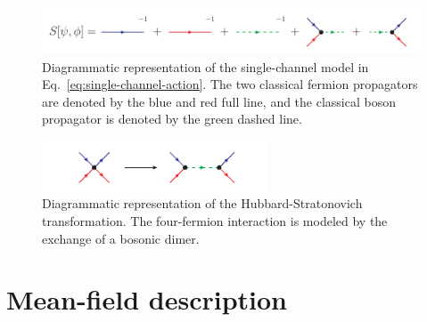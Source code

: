 \begin{figure}[t]
	\centering
	\includegraphics[width=\textwidth]{figs/action.pdf}
	\caption[Single-channel model]{Diagrammatic representation of the single-channel model in Eq.~\eqref{eq:single-channel-action}.
	The two classical fermion propagators are denoted by the blue and red full line, and the classical boson propagator is denoted by the green dashed line.}
	\label{fig:single-channel-model}
\end{figure}


\begin{figure}[b]
	\centering
	\includegraphics[width=0.6\textwidth]{figs/interaction.pdf}
	\caption[Microscopic interaction]{Diagrammatic representation of the Hubbard-Stratonovich transformation. The four-fermion interaction is modeled by the exchange of a bosonic dimer.}
	\label{fig:interaction}
\end{figure}


\section{Mean-field description} %
\label{section:nambu-gorkov-formalism}

